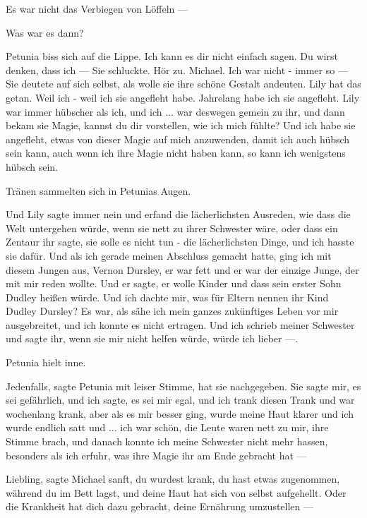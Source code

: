 \glqq{}Es war nicht das Verbiegen von Löffeln ---\grqq{}

\glqq{}Was war es dann?\grqq{}

Petunia biss sich auf die Lippe. \glqq{}Ich kann es dir nicht einfach sagen. Du
wirst denken, dass ich ---\grqq{} Sie schluckte. \glqq{}Hör zu. Michael. Ich war
nicht - immer so ---\grqq{} Sie deutete auf sich selbst, als wolle sie ihre
schöne Gestalt andeuten. \glqq{}Lily hat das getan. Weil ich - weil ich sie
angefleht habe. Jahrelang habe ich sie angefleht. Lily war immer hübscher als
ich, und ich ... war deswegen gemein zu ihr, und dann bekam sie Magie, kannst du
dir vorstellen, wie ich mich fühlte? Und ich habe sie angefleht, etwas von
dieser Magie auf mich anzuwenden, damit ich auch hübsch sein kann, auch wenn ich
ihre Magie nicht haben kann, so kann ich wenigstens hübsch sein.\grqq{}

Tränen sammelten sich in Petunias Augen.

\glqq{}Und Lily sagte immer nein und erfand die lächerlichsten Ausreden, wie dass
die Welt untergehen würde, wenn sie nett zu ihrer Schwester wäre, oder dass ein
Zentaur ihr sagte, sie solle es nicht tun - die lächerlichsten Dinge, und ich
hasste sie dafür. Und als ich gerade meinen Abschluss gemacht hatte, ging ich
mit diesem Jungen aus, Vernon Dursley, er war fett und er war der einzige Junge,
der mit mir reden wollte. Und er sagte, er wolle Kinder und dass sein erster
Sohn Dudley heißen würde. Und ich dachte mir, was für Eltern nennen ihr Kind
Dudley Dursley? Es war, als sähe ich mein ganzes zukünftiges Leben vor mir
ausgebreitet, und ich konnte es nicht ertragen. Und ich schrieb meiner Schwester
und sagte ihr, wenn sie mir nicht helfen würde, würde ich lieber ---\grqq{}.

Petunia hielt inne.

\glqq{}Jedenfalls\grqq{}, sagte Petunia mit leiser Stimme, \glqq{}hat sie
nachgegeben. Sie sagte mir, es sei gefährlich, und ich sagte, es sei mir egal,
und ich trank diesen Trank und war wochenlang krank, aber als es mir besser
ging, wurde meine Haut klarer und ich wurde endlich satt und ... ich war schön,
die Leute waren nett zu mir\grqq{}, ihre Stimme brach, \glqq{}und danach konnte
ich meine Schwester nicht mehr hassen, besonders als ich erfuhr, was ihre Magie
ihr am Ende gebracht hat ---\grqq{}

\glqq{}Liebling\grqq{}, sagte Michael sanft, \glqq{}du wurdest krank, du hast
etwas zugenommen, während du im Bett lagst, und deine Haut hat sich von selbst
aufgehellt. Oder die Krankheit hat dich dazu gebracht, deine Ernährung
umzustellen ---\grqq{}

